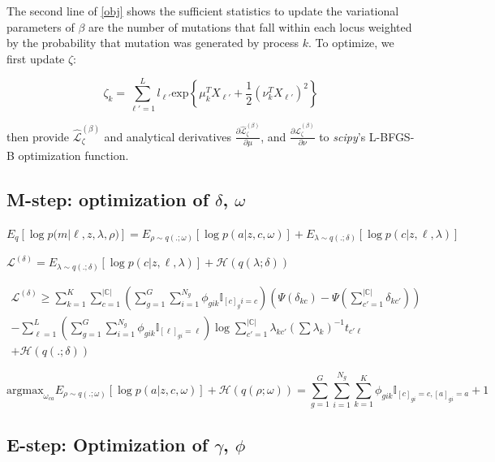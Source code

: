 \documentclass{article}
\newcommand{\Lagr}{\mathcal{L}}
\newcommand{\surrB}{\hat{\Lagr}^{(\beta)}_{\zeta}}
\begin{document}
The second line of \eqref{obj} shows the sufficient statistics to update the variational parameters of $\beta$ are the number of mutations that fall within each locus weighted by the probability that mutation was generated by process $k$. To optimize, we first update $\zeta$:

\begin{equation}
\zeta_k = \sum_{\ell'=1}^L l_{\ell'}\textrm{exp} \left\{ \mu_k^T X_{\ell'} + \frac{1}{2}(\nu_k^T X_{\ell'})^2 \right\}
\end{equation}

then provide $\surrB$ and analytical derivatives $\frac{\partial\surrB}{\partial\mu}$, and $\frac{\partial\surrB}{\partial\nu}$ to \emph{scipy}'s L-BFGS-B optimization function.


\subsection{M-step: optimization of $\delta$, $\omega$ }

$ E_q [\log{p(m | \ell, z, \lambda, \rho})] = E_{\rho \sim q(.;\omega)} [\log p(a|z,c,\omega)] + E_{\lambda \sim q(.;\delta)} [\log p(c|z,\ell,\lambda) ]$

$\Lagr^{(\delta)} = E_{\lambda \sim q(.;\delta)} [\log p(c|z,\ell,\lambda)] + \mathcal{H}(q(\lambda; \delta)) $

\begin{equation}
\begin{split}
\Lagr^{(\delta)} \geq \sum_{k=1}^K \sum_{c=1}^{|\mathbb{C}|} \left(\sum_{g=1}^G\sum_{i=1}^{N_g} \phi_{gik} \mathbb{I}_{[c]_gi = c}\right) \left( \Psi(\delta_{kc}) - 		\Psi(\sum_{c'=1}^{|\mathbb{C}|} \delta_{kc'}) \right) 
	\\ - \sum_{\ell=1}^L \left(\sum_{g=1}^G\sum_{i=1}^{N_g} \phi_{gik} \mathbb{I}_{[\ell]_{gi} = \ell} \right) \log{\sum_{c'=1}^{|\mathbb{C}|} \lambda_{kc'}(\sum \lambda_k)^{-1} t_{c'\ell}} \\
	+ \mathcal{H}(q(.;\delta))
\end{split}
\end{equation}


\begin{equation}
\mathrm{argmax}_{\omega_{ca}} E_{\rho \sim q(.;\omega)} [\log p(a|z,c,\omega)] + \mathcal{H}(q(\rho; \omega)) = \sum_{g=1}^G\sum_{i=1}^{N_g}\sum_{k=1}^K \phi_{gik} \mathbb{I}_{[c]_{gi} =c, [a]_{gi} = a} + 1
\end{equation}


\subsection{E-step: Optimization of $\gamma$, $\phi$}
\end{document}
